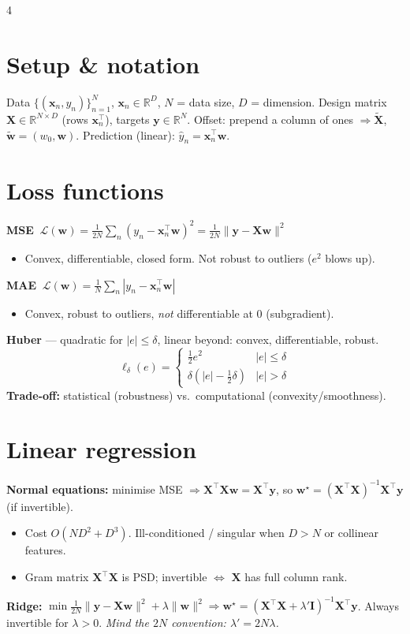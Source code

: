 \documentclass[a4paper,8pt,landscape]{extarticle}
\newcommand{\R}{\mathbb{R}}
\newcommand{\Lw}{\mathcal{L}(\bm{w})}
\newcommand{\xn}{\bm{x}_n}
\newcommand{\w}{\bm{w}}
\begin{document}
\begin{multicols*}{4}

\section*{Setup \& notation}
Data $\{(\xn,y_n)\}_{n=1}^N$, $\xn\in\R^D$, $N$ = data size, $D$ = dimension.
Design matrix $\bm{X}\in\R^{N\times D}$ (rows $\xn^\top$), targets $\bm{y}\in\R^N$.
Offset: prepend a column of ones $\Rightarrow \tilde{\bm{X}}$, $\tilde{\w}=(w_0,\w)$.
Prediction (linear): $\hat{y}_n=\xn^\top\w$.

\section*{Loss functions}
\textbf{MSE} $\ \Lw=\frac{1}{2N}\sum_n (y_n-\xn^\top\w)^2=\frac{1}{2N}\|\bm{y}-\bm{X}\w\|^2$
\begin{itemize}
\item Convex, differentiable, closed form. Not robust to outliers ($e^2$ blows up).
\end{itemize}
\textbf{MAE} $\ \Lw=\frac{1}{N}\sum_n|y_n-\xn^\top\w|$
\begin{itemize}
\item Convex, robust to outliers, \emph{not} differentiable at 0 (subgradient).
\end{itemize}
\textbf{Huber} — quadratic for $|e|\le\delta$, linear beyond: convex, differentiable, robust.
\[\!\!\ell_\delta(e)=\begin{cases}\tfrac12 e^2 & |e|\le\delta\\ \delta(|e|-\tfrac12\delta)&|e|>\delta\end{cases}\]
\textbf{Trade-off:} statistical (robustness) vs.\ computational (convexity/smoothness).

\section*{Linear regression}
\textbf{Normal equations:} minimise MSE $\Rightarrow \bm{X}^\top\bm{X}\w=\bm{X}^\top\bm{y}$,
so $\w^\star=(\bm{X}^\top\bm{X})^{-1}\bm{X}^\top\bm{y}$ (if invertible).
\begin{itemize}
\item Cost $O(ND^2+D^3)$. Ill-conditioned / singular when $D>N$ or collinear features.
\item Gram matrix $\bm{X}^\top\bm{X}$ is PSD; invertible $\iff$ $\bm{X}$ has full column rank.
\end{itemize}
\textbf{Ridge:} $\min \frac{1}{2N}\|\bm{y}-\bm{X}\w\|^2+\lambda\|\w\|^2
\Rightarrow \w^\star=(\bm{X}^\top\bm{X}+\lambda' \bm{I})^{-1}\bm{X}^\top\bm{y}$.
Always invertible for $\lambda>0$. \emph{Mind the $2N$ convention: $\lambda'=2N\lambda$.}


\end{multicols*}
\end{document}
